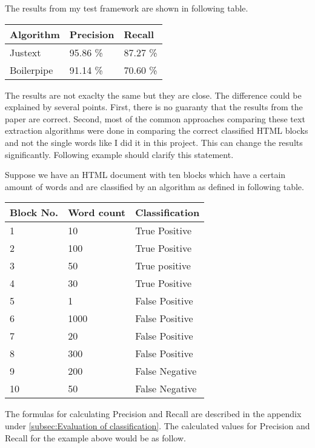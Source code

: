 The results from my test framework are shown in following table.    

\begin{tabular}{| p{3cm} | p{3cm} | p{3cm} | }
    \hline
    \textbf{Algorithm}      & \textbf{Precision}  & \textbf{Recall} 				\\ \hline
    Justext     & 95.86 \%       &  87.27 \%		\\ \hline
    Boilerpipe & 91.14 \%       &  70.60 \%		\\ \hline
\end{tabular}

The results are not exaclty the same but they are close. The difference could be explained by several points. First, there is no guaranty that the results from the paper are correct. Second, most of the common approaches comparing these text extraction algorithms were done in comparing the correct classified HTML blocks and not the single words like I did it in this project. This can change the results significantly. Following example should clarify this statement.

Suppose we have an HTML document with ten blocks which have a certain amount of words and are classified by an algorithm as defined in following table.

\begin{tabular}{| p{2cm} | p{3cm} | p{3cm} | }
    \hline
    \textbf{Block No.}      & \textbf{Word count}  & \textbf{Classification} 				\\ \hline
    1     & 10      	&  True Positive	\\ \hline
    2     & 100     	&  True Positive	\\ \hline
    3     & 50       	&  True positive	\\ \hline
    4     & 30       	&  True Positive	\\ \hline
    5     & 1       	&  False Positive	\\ \hline
    6     & 1000      	&  False Positive	\\ \hline
    7     & 20      	&  False Positive	\\ \hline
    8     & 300       	&  False Positive	\\ \hline
    9     & 200       	&  False Negative	\\ \hline
    10    & 50        	&  False Negative	\\ \hline
\end{tabular}

The formulas for calculating Precision and Recall are described in the appendix under \ref{subsec:Evaluation of classification}.
The calculated values for Precision and Recall for the example above would be as follow.

